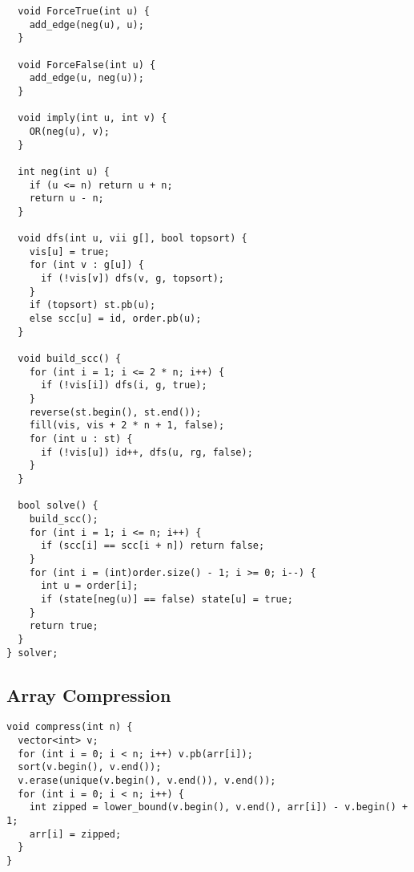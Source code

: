 \documentclass[10pt,a4paper,onesided]{article}
\begin{document}
\begin{multicols*}{3}
\begin{lstlisting}
  void ForceTrue(int u) {
    add_edge(neg(u), u);
  }

  void ForceFalse(int u) {
    add_edge(u, neg(u));
  }

  void imply(int u, int v) {
    OR(neg(u), v);
  }

  int neg(int u) {
    if (u <= n) return u + n;
    return u - n;
  }

  void dfs(int u, vii g[], bool topsort) {
    vis[u] = true;
    for (int v : g[u]) {
      if (!vis[v]) dfs(v, g, topsort);
    }
    if (topsort) st.pb(u);
    else scc[u] = id, order.pb(u);
  }

  void build_scc() {
    for (int i = 1; i <= 2 * n; i++) {
      if (!vis[i]) dfs(i, g, true);
    }
    reverse(st.begin(), st.end());
    fill(vis, vis + 2 * n + 1, false);
    for (int u : st) {
      if (!vis[u]) id++, dfs(u, rg, false);
    }
  }

  bool solve() {
    build_scc();
    for (int i = 1; i <= n; i++) {
      if (scc[i] == scc[i + n]) return false;
    }
    for (int i = (int)order.size() - 1; i >= 0; i--) {
      int u = order[i];
      if (state[neg(u)] == false) state[u] = true;
    }
    return true;
  }
} solver;
\end{lstlisting}
\subsection{Array Compression}
\begin{lstlisting}
void compress(int n) {
  vector<int> v;
  for (int i = 0; i < n; i++) v.pb(arr[i]);
  sort(v.begin(), v.end());
  v.erase(unique(v.begin(), v.end()), v.end());
  for (int i = 0; i < n; i++) {
    int zipped = lower_bound(v.begin(), v.end(), arr[i]) - v.begin() + 1;
    arr[i] = zipped;
  }
} 
\end{lstlisting}

\end{multicols*}
\end{document}
